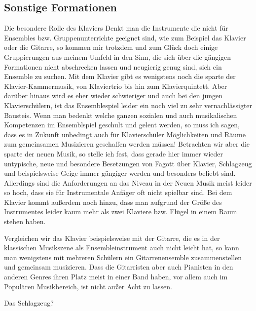\subsection{Sonstige Formationen}
Die besondere Rolle des Klaviers
Denkt man die Instrumente die nicht für Ensembles bzw. Gruppenunterrichte geeignet sind, wie zum
Beispiel das Klavier oder die Gitarre, so kommen mir trotzdem und zum Glück doch
einige Gruppierungen aus meinem Umfeld in den Sinn, die sich über die gängigen
Formationen nicht abschrecken lassen und neugierig genug sind, sich ein Ensemble
zu suchen. Mit dem Klavier gibt es wenigstens noch die sparte der
Klavier-Kammermusik, von Klaviertrio bis hin zum Klavierquintett. Aber darüber
hinaus wird es eher wieder schwieriger und auch bei den jungen Klavierschülern,
ist das Ensemblespiel leider ein noch viel zu sehr vernachlässigter Bausteis.
Wenn man bedenkt welche ganzen sozialen und auch musikalischen Kompetenzen im
Ensemblspiel geschult und gelent werden, so muss ich sagen, dass es in Zukunft
unbedingt auch für Klavierschüler Möglichkeiten und Räume zum gemeinsamen
Musizieren geschaffen werden müssen! Betrachten wir aber die sparte der neuen
Musik, so stelle ich fest, dass gerade hier immer wieder untypische, neue und
besondere Besetzungen von Fagott über Klavier, Schlagzeug und beispielsweise
Geige immer gängiger werden und besonders beliebt sind. Allerdings sind die
Anforderungen an das Niveau in der Neuen Musik meist leider so hoch, dass sie
für Instrumentale Anfäger oft nicht spielbar sind. 
Bei dem Klavier kommt außerdem noch hinzu, dass man aufgrund der Größe des
Instrumentes leider kaum mehr als zwei Klaviere bzw. Flügel in einem Raum stehen
haben. 

Vergleichen wir das Klavier beispielsweise mit der Gitarre, die es in der
klassischen Musikszene als Ensembleinstrument auch nicht leicht hat, so kann man
wenigstens mit mehreren Schülern ein Gitarrenensemble zusammenstellen und
gemeinsam musizieren. Dass die Gitarristen aber auch Pianisten in den anderen Genres ihren Platz
meist in einer Band haben, vor allem auch im Populären Musikbereich, ist nicht
außer Acht zu lassen. 

Das Schlagzeug?





